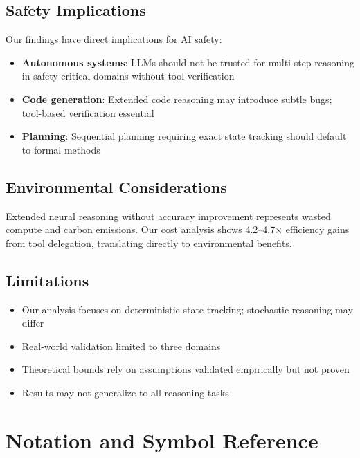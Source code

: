 \documentclass{article}
\theoremstyle{plain}
\theoremstyle{definition}
\theoremstyle{remark}
\begin{document}
\subsection{Safety Implications}

Our findings have direct implications for AI safety:
\begin{itemize}
\item \textbf{Autonomous systems}: LLMs should not be trusted for multi-step reasoning in safety-critical domains without tool verification
\item \textbf{Code generation}: Extended code reasoning may introduce subtle bugs; tool-based verification essential
\item \textbf{Planning}: Sequential planning requiring exact state tracking should default to formal methods
\end{itemize}

\subsection{Environmental Considerations}

Extended neural reasoning without accuracy improvement represents wasted compute and carbon emissions. Our cost analysis shows 4.2--4.7$\times$ efficiency gains from tool delegation, translating directly to environmental benefits.

\subsection{Limitations}

\begin{itemize}
\item Our analysis focuses on deterministic state-tracking; stochastic reasoning may differ
\item Real-world validation limited to three domains
\item Theoretical bounds rely on assumptions validated empirically but not proven
\item Results may not generalize to all reasoning tasks
\end{itemize}


\section{Notation and Symbol Reference}
\label{app:notation}
\end{document}
